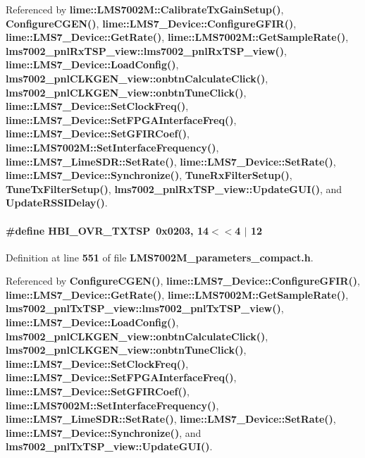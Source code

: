 Referenced by {\bf lime\+::\+L\+M\+S7002\+M\+::\+Calibrate\+Tx\+Gain\+Setup()}, {\bf Configure\+C\+G\+E\+N()}, {\bf lime\+::\+L\+M\+S7\+\_\+\+Device\+::\+Configure\+G\+F\+I\+R()}, {\bf lime\+::\+L\+M\+S7\+\_\+\+Device\+::\+Get\+Rate()}, {\bf lime\+::\+L\+M\+S7002\+M\+::\+Get\+Sample\+Rate()}, {\bf lms7002\+\_\+pnl\+Rx\+T\+S\+P\+\_\+view\+::lms7002\+\_\+pnl\+Rx\+T\+S\+P\+\_\+view()}, {\bf lime\+::\+L\+M\+S7\+\_\+\+Device\+::\+Load\+Config()}, {\bf lms7002\+\_\+pnl\+C\+L\+K\+G\+E\+N\+\_\+view\+::onbtn\+Calculate\+Click()}, {\bf lms7002\+\_\+pnl\+C\+L\+K\+G\+E\+N\+\_\+view\+::onbtn\+Tune\+Click()}, {\bf lime\+::\+L\+M\+S7\+\_\+\+Device\+::\+Set\+Clock\+Freq()}, {\bf lime\+::\+L\+M\+S7\+\_\+\+Device\+::\+Set\+F\+P\+G\+A\+Interface\+Freq()}, {\bf lime\+::\+L\+M\+S7\+\_\+\+Device\+::\+Set\+G\+F\+I\+R\+Coef()}, {\bf lime\+::\+L\+M\+S7002\+M\+::\+Set\+Interface\+Frequency()}, {\bf lime\+::\+L\+M\+S7\+\_\+\+Lime\+S\+D\+R\+::\+Set\+Rate()}, {\bf lime\+::\+L\+M\+S7\+\_\+\+Device\+::\+Set\+Rate()}, {\bf lime\+::\+L\+M\+S7\+\_\+\+Device\+::\+Synchronize()}, {\bf Tune\+Rx\+Filter\+Setup()}, {\bf Tune\+Tx\+Filter\+Setup()}, {\bf lms7002\+\_\+pnl\+Rx\+T\+S\+P\+\_\+view\+::\+Update\+G\+U\+I()}, and {\bf Update\+R\+S\+S\+I\+Delay()}.

\paragraph[{H\+B\+I\+\_\+\+O\+V\+R\+\_\+\+T\+X\+T\+SP}]{\setlength{\rightskip}{0pt plus 5cm}\#define H\+B\+I\+\_\+\+O\+V\+R\+\_\+\+T\+X\+T\+SP~0x0203, 14$<$$<$4 $\vert$  12}\label{LMS7002M__parameters__compact_8h_a847a5e2ba0992cd931b4098c8aaf9495}


Definition at line {\bf 551} of file {\bf L\+M\+S7002\+M\+\_\+parameters\+\_\+compact.\+h}.



Referenced by {\bf Configure\+C\+G\+E\+N()}, {\bf lime\+::\+L\+M\+S7\+\_\+\+Device\+::\+Configure\+G\+F\+I\+R()}, {\bf lime\+::\+L\+M\+S7\+\_\+\+Device\+::\+Get\+Rate()}, {\bf lime\+::\+L\+M\+S7002\+M\+::\+Get\+Sample\+Rate()}, {\bf lms7002\+\_\+pnl\+Tx\+T\+S\+P\+\_\+view\+::lms7002\+\_\+pnl\+Tx\+T\+S\+P\+\_\+view()}, {\bf lime\+::\+L\+M\+S7\+\_\+\+Device\+::\+Load\+Config()}, {\bf lms7002\+\_\+pnl\+C\+L\+K\+G\+E\+N\+\_\+view\+::onbtn\+Calculate\+Click()}, {\bf lms7002\+\_\+pnl\+C\+L\+K\+G\+E\+N\+\_\+view\+::onbtn\+Tune\+Click()}, {\bf lime\+::\+L\+M\+S7\+\_\+\+Device\+::\+Set\+Clock\+Freq()}, {\bf lime\+::\+L\+M\+S7\+\_\+\+Device\+::\+Set\+F\+P\+G\+A\+Interface\+Freq()}, {\bf lime\+::\+L\+M\+S7\+\_\+\+Device\+::\+Set\+G\+F\+I\+R\+Coef()}, {\bf lime\+::\+L\+M\+S7002\+M\+::\+Set\+Interface\+Frequency()}, {\bf lime\+::\+L\+M\+S7\+\_\+\+Lime\+S\+D\+R\+::\+Set\+Rate()}, {\bf lime\+::\+L\+M\+S7\+\_\+\+Device\+::\+Set\+Rate()}, {\bf lime\+::\+L\+M\+S7\+\_\+\+Device\+::\+Synchronize()}, and {\bf lms7002\+\_\+pnl\+Tx\+T\+S\+P\+\_\+view\+::\+Update\+G\+U\+I()}.

